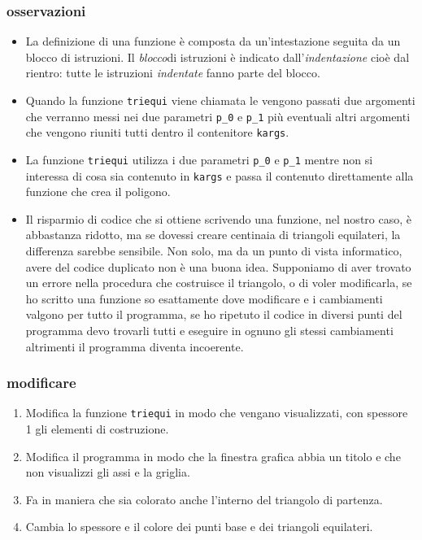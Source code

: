 \subsubsection{osservazioni}

\begin{itemize} [noitemsep]
 \item La definizione di una funzione è composta da un'intestazione seguita da 
un blocco di istruzioni. Il \emph{blocco}di istruzioni è indicato 
dall'\emph{indentazione} cioè dal rientro: tutte le istruzioni \emph{indentate} 
fanno parte del blocco.
 \item Quando la funzione \lstinline{triequi} viene chiamata le vengono passati 
due argomenti che verranno messi nei due parametri \lstinline{p_0} e
\lstinline{p_1} più eventuali altri argomenti che vengono riuniti tutti dentro 
il contenitore \lstinline{kargs}.
 \item La funzione \lstinline{triequi}  utilizza i due parametri 
\lstinline{p_0} 
e \lstinline{p_1} mentre non si interessa di cosa sia contenuto in 
\lstinline{kargs} e passa il contenuto direttamente alla funzione che crea il 
poligono.
 \item Il risparmio di codice che si ottiene scrivendo una funzione, nel nostro 
caso, è abbastanza ridotto, ma se dovessi creare centinaia di triangoli 
equilateri, la differenza sarebbe sensibile. Non solo, ma da un punto di vista 
informatico, avere del codice duplicato non è una buona idea. Supponiamo di 
aver trovato un errore nella procedura che costruisce il triangolo, o di voler 
modificarla, se ho scritto una funzione so esattamente dove modificare e i 
cambiamenti valgono per tutto il programma, se ho ripetuto il codice in diversi 
punti del programma devo trovarli tutti e eseguire in ognuno gli stessi 
cambiamenti altrimenti il programma diventa incoerente.
\end{itemize}

\subsubsection{modificare}

\begin{enumerate} [noitemsep]
 \item Modifica la funzione \lstinline{triequi} in modo che vengano 
visualizzati, con spessore 1 gli elementi di costruzione.
 \item Modifica il programma in modo che la finestra grafica abbia un titolo e 
che non visualizzi gli assi e la griglia.
 \item Fa in maniera che sia colorato anche l'interno del triangolo di partenza.
 \item Cambia lo spessore e il colore dei punti base e dei triangoli equilateri.
\end{enumerate}

